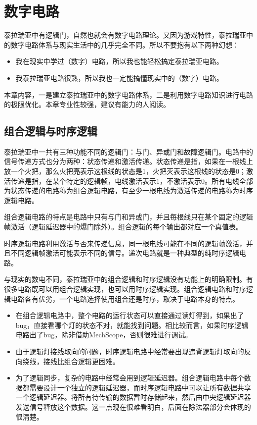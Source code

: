 \chapter{数字电路}\label{chap7}
泰拉瑞亚中有逻辑门，自然也就会有数字电路理论。又因为游戏特性，泰拉瑞亚中的数字电路体系与现实生活中的几乎完全不同。所以不要抱有以下两种幻想：
\begin{itemize}
  \item 我在现实中学过（数字）电路，所以我也能轻松搞定泰拉瑞亚电路。
  \item 我泰拉瑞亚电路很熟，所以我也一定能搞懂现实中的（数字）电路。
\end{itemize}

本章内容，一是建立泰拉瑞亚中的数字电路体系，二是利用数字电路知识进行电路的极限优化。本章专业性较强，建议有能力的人阅读。

\section{组合逻辑与时序逻辑}
泰拉瑞亚中一共有三种功能不同的逻辑门：与门、异或门和故障逻辑门。电路中的信号传递方式也分为两种：状态传递和激活传递。状态传递是指，如果在一根线上放一个火把，那么火把亮表示这根线的状态是1，火把灭表示这根线的状态是0；激活传递是指，在某个特定的逻辑帧，电线激活表示1，不激活表示0。所有电线全部为状态传递的电路称为组合逻辑电路，有至少一根电线为激活传递的电路称为时序逻辑电路。

组合逻辑电路的特点是电路中只有与门和异或门，并且每根线只在某个固定的逻辑帧激活（逻辑延迟器中的爆门除外）。组合逻辑的每个输出都对应一个真值表。

时序逻辑电路利用激活与否来传递信息，同一根电线可能在不同的逻辑帧激活，并且不同逻辑帧激活可能表示不同的信号。递次电路就是一种典型的纯时序逻辑电路。

与现实的数电不同，泰拉瑞亚中的组合逻辑和时序逻辑没有功能上的明确限制。有很多电路既可以用组合逻辑实现，也可以用时序逻辑实现。组合逻辑电路和时序逻辑电路各有优劣，一个电路选择使用组合还是时序，取决于电路本身的特点。
\begin{itemize}
  \item 在组合逻辑电路中，整个电路的运行状态可以直接通过读灯得到，如果出了bug，直接看哪个灯的状态不对，就能找到问题。相比较而言，如果时序逻辑电路出了bug，除非借助MechScope，否则很难进行调试。
  \item 由于逻辑灯接线取向的问题，时序逻辑电路中经常要出现违背逻辑灯取向的反向绕线，接线比组合逻辑更困难。
  \item 为了逻辑同步，复杂的电路中经常会用到逻辑延迟器。组合逻辑电路中每个数据都需要设计一个独立的逻辑延迟器，而时序逻辑电路中可以让所有数据共享一个逻辑延迟器。将所有待传输的数据暂时存储起来，然后由中央逻辑延迟器发送信号释放这个数据。这一点现在很难看明白，后面在除法器部分会体现的很清楚。
\end{itemize}

